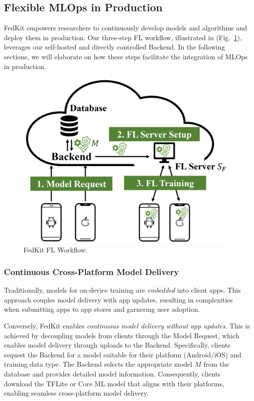 \documentclass[letterpaper]{article} %
\begin{document}
\subsection{Flexible MLOps in Production}
\newcommand{\model}{$M$}
\newcommand{\fs}{$S_\mathrm F$}
FedKit empowers researchers to continuously develop models and algorithms and
deploy them in production.
Our three-step FL workflow, illustrated in (Fig.~\ref{fig:fl-workflow}),
leverages our self-hosted and directly controlled Backend.
In the following sections, we will elaborate on how these steps facilitate the integration of MLOps in production.
\begin{figure}
    \centering
    \includegraphics*[width=0.8\linewidth]{fl_workflow.pdf}
    \caption{FedKit FL Workflow.}
    \label{fig:fl-workflow}
\end{figure}

\subsubsection{Continuous Cross-Platform Model Delivery}
Traditionally, models for on-device training are \textit{embedded} into client apps.
This approach couples model delivery with app updates, 
resulting in complexities when submitting apps to app stores and garnering user adoption.


Conversely,
FedKit enables \textit{continuous model delivery without app updates}.
This is achieved by decoupling models from clients through the Model Request, which enables model delivery through uploads to the Backend.
Specifically, clients request the Backend for a model suitable for
their platform (Android/iOS) and training data type.
The Backend selects the appropriate model \model{} from the database and
provides detailed model information.
Consequently, clients download the TFLite or Core ML model that aligns with
their platforms,
enabling seamless cross-platform model delivery.
\end{document}
